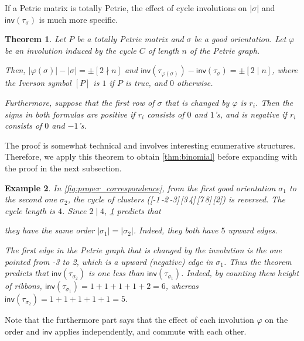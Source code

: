\documentclass[pdflatex,sn-mathphys-num]{sn-jnl}%
\theoremstyle{thmstyleone}%
\newtheorem{theorem}{Theorem}[section]
\theoremstyle{thmstyletwo}%
\newtheorem{example}[theorem]{Example}
\theoremstyle{thmstylethree}%
\numberwithin{equation}{section}
\newcommand{\inv}{\mathsf{inv}}
\begin{document}
        If a Petrie matrix is totally Petrie, the effect of cycle involutions on $|\sigma|$ and $\inv(\tau_\sigma)$ is much more specific.
        \begin{theorem}\label{thm:InvoChangeWeight}
            Let $P$ be a totally Petrie matrix and $\sigma$ be a good orientation. Let $\varphi$ be an involution induced by the cycle $C$ of length $n$ of the Petrie graph.
            
            Then, 
            $|\varphi(\sigma)|-|\sigma|=\pm [2\nmid n]$ and 
            $\inv(\tau_{\varphi(\sigma)})-\inv(\tau_\sigma)=\pm [2\mid n]$,
            where the Iverson symbol $[P]$ is $1$ if $P$ is true, and $0$ otherwise.

            Furthermore, suppose that the first row of $\sigma$ that is changed by $\varphi$ is $r_i$. Then the signs in both formulas are positive if $r_i$ consists of $0$ and $1$'s, and is negative if $r_i$ consists of $0$ and $-1$'s.
        \end{theorem}
        The proof is somewhat technical and involves interesting enumerative structures. Therefore, we apply this theorem to obtain \cref{thm:binomial} before expanding with the proof in the next subsection.
        \begin{example}
            In \cref{fig:proper_correspondence}, from the first good orientation $\sigma_1$ to the second one $\sigma_2$, the cycle of clusters ([-1\,-2\,-3]\,[3\,4]\,[7\,8]\,[2]) is reversed. The cycle length is $4$. Since $2\mid4$, \cref{thm:InvoChangeWeight} predicts that \begin{enumerate*}[(1)]
                \item they have the same order $|\sigma_1|=|\sigma_2|$. Indeed, they both have $5$ upward edges.
                \item The first edge in the Petrie graph that is changed by the involution is the one pointed from -3 to 2, which is a upward (negative) edge in $\sigma_1$. Thus the theorem predicts that $\inv(\tau_{\sigma_2})$ is one less than $\inv(\tau_{\sigma_1})$.
                Indeed, by counting thew height of ribbons, $\inv(\tau_{\sigma_1})=1+1+1+1+2=6$, whereas $\inv(\tau_{\sigma_2})=1+1+1+1+1=5$.
            \end{enumerate*}
        \end{example}
        Note that the furthermore part says that the effect of each involution $\varphi$ on the order and $\inv$ applies independently, and commute with each other. 
        
\end{document}

